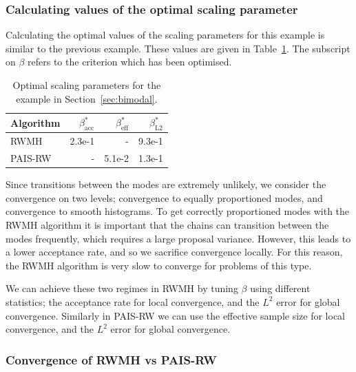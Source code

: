 \documentclass[final]{siamltex}
\begin{document}

\subsubsection{Calculating values of the optimal scaling parameter}
\label{sec:BM2_opt_beta}

Calculating the optimal values of the scaling parameters for this
example is similar to the previous example. These values are given in
Table~\ref{tab:BM2_opt_delta}. The subscript on $\beta$ refers to the
criterion which has been optimised.

\begin{table}[!htb]
      \centering
        \begin{tabular}{|l|r|r|r|}
	\hline
	Algorithm							& $\beta^*_{\text{acc}}$	& $\beta^*_{\text{eff}}$	& $\beta^*_{\text{L2}}$ \\ \hline
	RWMH								& 2.3e-1					& - 						& 9.3e-1\\
	PAIS-RW								& -						& 5.1e-2 					& 1.3e-1\\
	\hline
	\end{tabular}
	\vspace{2mm}
	\caption{Optimal scaling parameters for the example in Section~\ref{sec:bimodal}.}
	\label{tab:BM2_opt_delta}
\end{table}

Since transitions between the modes are extremely unlikely, we
consider the convergence on two levels; convergence to equally
proportioned modes, and convergence to smooth histograms.
To get correctly proportioned modes with the RWMH algorithm it is
important that the chains can transition between the modes frequently,
which requires a large proposal variance. However, this leads to a
lower acceptance rate, and so we sacrifice convergence locally. For
this reason, the RWMH algorithm is very slow to converge for problems
of this type.

We can achieve these two regimes in RWMH by tuning $\beta$ using
different statistics; the acceptance rate for local convergence, and
the $L^2$ error for global convergence. Similarly in PAIS-RW we can
use the effective sample size for local convergence, and the $L^2$
error for global convergence.


\subsubsection{Convergence of RWMH vs PAIS-RW}
\end{document}

